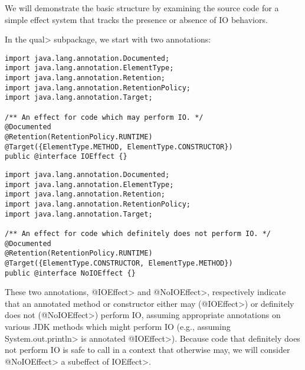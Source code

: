 We will demonstrate the basic structure by examining the source code for a simple effect system that tracks the presence or absence of IO behaviors.

In the \<qual> subpackage, we start with two annotations:

\begin{Verbatim}
import java.lang.annotation.Documented;
import java.lang.annotation.ElementType;
import java.lang.annotation.Retention;
import java.lang.annotation.RetentionPolicy;
import java.lang.annotation.Target;

/** An effect for code which may perform IO. */
@Documented
@Retention(RetentionPolicy.RUNTIME)
@Target({ElementType.METHOD, ElementType.CONSTRUCTOR})
public @interface IOEffect {}
\end{Verbatim}

\begin{Verbatim}
import java.lang.annotation.Documented;
import java.lang.annotation.ElementType;
import java.lang.annotation.Retention;
import java.lang.annotation.RetentionPolicy;
import java.lang.annotation.Target;

/** An effect for code which definitely does not perform IO. */
@Documented
@Retention(RetentionPolicy.RUNTIME)
@Target({ElementType.CONSTRUCTOR, ElementType.METHOD})
public @interface NoIOEffect {}
\end{Verbatim}

These two annotations, \<@IOEffect> and \<@NoIOEffect>, respectively indicate that an annotated method or constructor either may (\<@IOEffect>) or definitely does not (\<@NoIOEffect>) perform IO, assuming appropriate annotations on various JDK methods which might perform IO (e.g., assuming \<System.out.println> is annotated \<@IOEffect>).
Because code that definitely does not perform IO is safe to call in a context that otherwise may, we will consider \<@NoIOEffect> a subeffect of \<IOEffect>.

